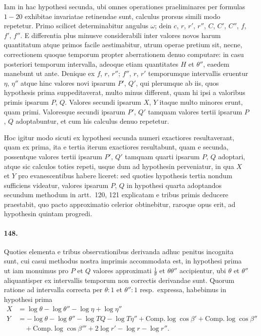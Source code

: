 \documentclass[12pt,a4paper]{article}
\begin{document}
Iam in hac hypothesi secunda, ubi omnes operationes praeliminares per formulas $1 - 20$ exhibitae invariatae retinendae sunt, calculus prorsus simili modo repetetur. Primo scilicet determinabitur angulus $\omega$; dein $c$, $r$, $r'$, $r''$, $C$, $C'$, $C''$, $f$, $f'$, $f''$. E differentia plus minusve considerabili inter valores novos harum quantitatum atque primos facile aestimabitur, utrum operae pretium sit, necne, correctionem quoque temporum propter aberrationem denuo computare: in casu posteriori temporum intervalla, adeoque etiam quantitates $H$ et $\theta''$, eaedem manebunt ut ante. Denique ex $f$, $r$, $r''$; $f''$, $r$, $r'$ temporumque intervallis eruentur $\eta$, $\eta''$ atque hinc valores novi ipsarum $P'$, $Q'$, qui plerumque ab iis, quos hypothesis prima suppeditaverat, multo minus different, quam hi ipsi a valoribus primis ipsarum $P$, $Q$. Valores secundi ipsarum $X$, $Y$ itaque multo minores erunt, quam primi. Valoresque secundi ipsarum $P'$, $Q'$ tamquam valores tertii ipsarum $P$, $Q$ adoptabuntur, et cum his calculus denuo repetetur.

Hoc igitur modo sicuti ex hypothesi secunda numeri exactiores resultaverant, quam ex prima, ita e tertia iterum exactiores resultabunt, quam e secunda, possentque valores tertii ipsarum $P'$, $Q'$ tamquam quarti ipsarum $P$, $Q$ adoptari, atque sic calculos toties repeti, usque dum ad hypothesin perveniatur, in qua $X$ et $Y$ pro evanescentibus habere liceret: sed quoties hypothesis tertia nondum sufficiens videatur, valores ipsarum $P$, $Q$ in hypothesi quarta adoptandos secundum methodum in artt.~120, 121 explicatam e tribus primis deducere praestabit, quo pacto approximatio celerior obtinebitur, raroque opus erit, ad hypothesin quintam progredi.

\paragraph{148.}
Quoties elementa e tribus observationibus derivanda adhuc penitus incognita sunt, cui casui methodus nostra imprimis accommodata est, in hypothesi prima ut iam monuimus pro $P$ et $Q$ valores approximati $\frac{1}{\theta}$ et $\theta\theta''$ accipientur, ubi $\theta$ et $\theta''$ aliquantisper ex intervallis temporum non correctis derivandae sunt. Quorum ratione ad intervalla correcta per $\theta : 1$ et $\theta'' : 1$ resp.~expressa, habebimus in hypothesi prima
\begin{align*}
X &= \log\theta - \log\theta'' - \log\eta + \log\eta''\\
Y &= -\log\theta - \log\theta'' - \log TQ - \log T\eta'' + \text{Comp.}\log\cos\beta' + \text{Comp.}\log\cos\beta''\\
&\quad + \text{Comp.}\log\cos\beta''' + 2\log r' - \log r - \log r''.
\end{align*}
\end{document}
